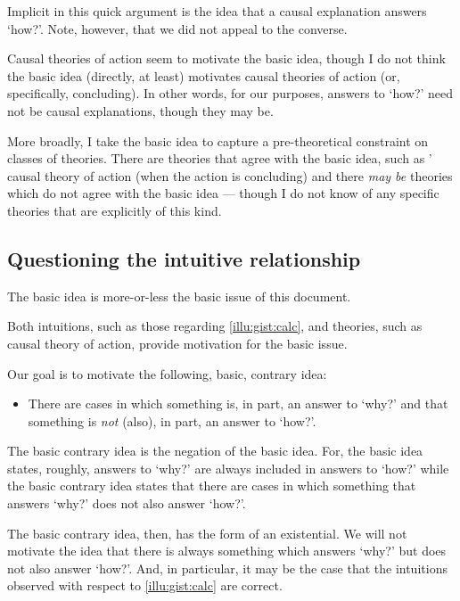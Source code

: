 \begin{note}
  Implicit in this quick argument is the idea that a causal explanation answers `how?'.
  Note, however, that we did not appeal to the converse.

  Causal theories of action seem to motivate the basic idea, though I do not think the basic idea (directly, at least) motivates causal theories of action (or, specifically, concluding).
  In other words, for our purposes, answers to `how?' need not be causal explanations, though they may be.

  More broadly, I take the basic idea to capture a pre-theoretical constraint on classes of theories.
  There are theories that agree with the basic idea, such as \citeauthor{Davidson:1963aa}' causal theory of action (when the action is concluding) and there \emph{may be} theories which do not agree with the basic idea --- though I do not know of any specific theories that are explicitly of this kind.
\end{note}

\subsection{Questioning the intuitive relationship}

\begin{note}
  The basic idea is more-or-less the basic issue of this document.

  Both intuitions, such as those regarding \autoref{illu:gist:calc}, and theories, such as \citeauthor{Davidson:1963aa} causal theory of action, provide motivation for the basic issue.

  Our goal is to motivate the following, basic, contrary idea:

  \begin{itemize}
  \item
    There are cases in which something is, in part, an answer to `why?' and that something is \emph{not} (also), in part, an answer to `how?'.
  \end{itemize}

  The basic contrary idea is the negation of the basic idea.
  For, the basic idea states, roughly, answers to `why?' are always included in answers to `how?' while the basic contrary idea states that there are cases in which something that answers `why?' does not also answer `how?'.

  The basic contrary idea, then, has the form of an existential.
  We will not motivate the idea that there is always something which answers `why?' but does not also answer `how?'.
  And, in particular, it may be the case that the intuitions observed with respect to \autoref{illu:gist:calc} are correct.
\end{note}

